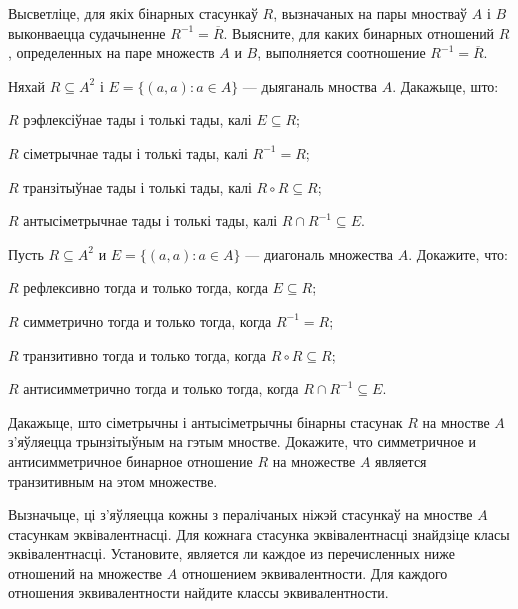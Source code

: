 \begin{problemList}
\problemItemSimple
{Высветліце, для якіх бінарных стасункаў $R$, вызначаных на пары мностваў $A$ і $B$ выконваецца судачыненне $R^{-1} = \overline{R}$.}
{Выясните, для каких бинарных отношений $R$, определенных на паре
множеств $A$ и $B$, выполняется соотношение $R^{-1} = \overline{R}$.}

\bigskip

\problemItemSimple
{%
Няхай $R \subseteq A^2$ і $E = \{(a, a) \colon a \in A\}$ --- дыяганаль мноства $A$. Дакажыце, што:
\begin{belarusianEnumerate}
	\item $R$ рэфлексіўнае тады і толькі тады, калі $E \subseteq R$;
	\item $R$ сіметрычнае тады і толькі тады, калі $R^{-1} = R$;
	\item $R$ транзітыўнае тады і толькі тады, калі $R \circ R \subseteq R$;
	\item $R$ антысіметрычнае тады і толькі тады, калі $R \cap R^{-1} \subseteq E$.
\end{belarusianEnumerate}
\textbf{}
\vspace{-1.5em}
}
{%
Пусть $R \subseteq A^2$ и $E = \{(a, a) \colon a \in A\}$ --- диагональ множества $A$. Докажите, что:
\begin{russianEnumerate}
	\item $R$ рефлексивно тогда и только тогда, когда $E \subseteq R$;
	\item $R$ симметрично тогда и только тогда, когда $R^{-1} = R$;
	\item $R$ транзитивно тогда и только тогда, когда $R \circ R \subseteq R$;
	\item $R$ антисимметрично тогда и только тогда, когда $R \cap R^{-1} \subseteq E$.
\end{russianEnumerate}
}

\bigskip

\problemItemSimple
{Дакажыце, што сіметрычны і антысіметрычны бінарны стасунак $R$ на мностве $A$ з'яўляецца трынзітыўным на гэтым мностве.}
{Докажите, что симметричное и антисимметричное бинарное отношение $R$ на множестве $A$ является транзитивным на этом множестве.}

\bigskip

\problemItemWithCommonPart
{Вызначыце, ці з'яўляецца кожны з пералічаных ніжэй стасункаў на мностве $A$ стасункам эквівалентнасці. Для кожнага стасунка эквівалентнасці знайдзіце класы эквівалентнасці.}
{Установите, является ли каждое из перечисленных ниже отношений на множестве $A$ отношением эквивалентности. Для каждого отношения эквивалентности найдите классы эквивалентности.}
{%
\begin{belarusianEnumerate}
	

\end{belarusianEnumerate}}
\end{problemList}
